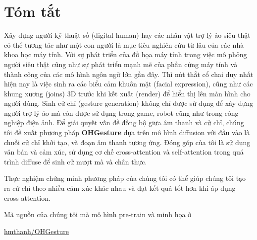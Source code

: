 \chapter*{Tóm tắt}
\label{abstract}

Xây dựng người kỹ thuật số (digital human) hay các nhân vật trợ lý ảo siêu thật có thể tương tác như một con người là mục tiêu nghiên cứu từ lâu của các nhà khoa học máy tính. Với sự phát triển của đồ họa máy tính trong việc mô phỏng người siêu thật cũng như sự phát triển mạnh mẽ của phần cứng máy tính và thành công của các mô hình ngôn ngữ lớn gần đây.
Thì nút thắt cổ chai duy nhất hiện nay là việc sinh ra các biểu cảm khuôn mặt (facial expression), cũng như các khung xương (joins) 3D trước khi kết xuất (render) để hiển thị lên màn hình cho người dùng.
Sinh cử chỉ (gesture generation) không chỉ được sử dụng để xây dựng người trợ lý ảo mà còn được sử dụng trong game, robot cũng như trong công nghiệp điện ảnh.
Để giải quyết vấn đề đồng bộ giữa âm thanh và cử chỉ, chúng tôi đề xuất phương pháp \textbf{OHGesture} dựa trên mô hình diffusion với đầu vào là chuỗi cử chỉ khởi tạo, và đoạn âm thanh tương ứng.
Đóng góp của tôi là sử dụng văn bản và cảm xúc, sử dụng cơ chế cross-attention và self-attention trong quá trình diffuse để sinh cử mượt mà và chân thực.

Thực nghiệm chứng minh phương pháp của chúng tôi có thể giúp chúng tôi tạo ra cử chỉ theo nhiều cảm xúc khác nhau và đạt kết quả tốt hơn khi áp dụng cross-attention.




Mã nguồn của chúng tôi mà mô hình pre-train và minh họa ở

\href{https://github.com/hmthanh/OHGesture}{hmthanh/OHGesture}